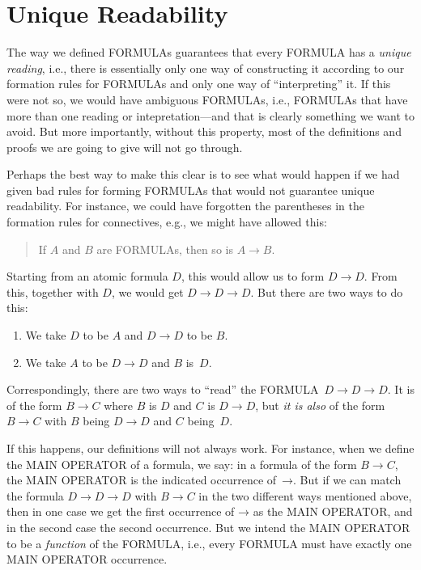 \documentclass[10pt,a4paper]{article}
\newcommand*{\olup}[1]{\MakeUppercase{#1}}
\theoremstyle{plain}
\theoremstyle{definition}
\theoremstyle{remark}
\newenvironment{explain}{}{}
\newcommand*{\olfileid}[3]{}
\newcommand*{\olsection}[1]{\section*{#1}}
\providecommand{\lif}{\mathbin{\rightarrow}}
\begin{document}



\olfileid{fol}{syn}{unq}

\olsection{Unique Readability}

\begin{explain}
The way we defined \olup{formula}s guarantees that every \olup{formula} has
a \emph{unique reading}, i.e., there is essentially only one way of
constructing it according to our formation rules for \olup{formula}s and
only one way of ``interpreting'' it.  If this were not so, we would
have ambiguous \olup{formula}s, i.e., \olup{formula}s that have more than
one reading or intepretation---and that is clearly something we want
to avoid.  But more importantly, without this property, most of the
definitions and proofs we are going to give will not go through.

Perhaps the best way to make this clear is to see what would happen if
we had given bad rules for forming \olup{formula}s that would not
guarantee unique readability.  For instance, we could have forgotten
the parentheses in the formation rules for connectives, e.g., we might
have allowed this:
\begin{quote}
If $A$ and $B$ are \olup{formula}s, then so is $A \lif B$.
\end{quote}
Starting from an atomic formula $D$, this would allow us to form $D
\lif D$. From this, together with $D$, we would get $D \lif D
\lif D$.  But there are two ways to do this:
\begin{enumerate}
\item We take $D$ to be $A$ and $D \lif D$ to be $B$.
\item We take $A$ to be $D \lif D$ and $B$ is~$D$.  
\end{enumerate}
Correspondingly, there are two ways to
``read'' the \olup{formula}~$D \lif D \lif D$. It is of the form $B
\lif C$ where $B$ is $D$ and $C$ is $D \lif D$, but \emph{it is
  also} of the form $B \lif C$ with $B$ being $D \lif D$ and $C$
being~$D$.

If this happens, our definitions will not always work. For instance,
when we define the \olup{main operator} of a formula, we say: in a
formula of the form $B \lif C$, the \olup{main operator} is the
indicated occurrence of~$\lif$. But if we can match the formula $D
\lif D \lif D$ with $B \lif C$ in the two different ways mentioned
above, then in one case we get the first occurrence of $\lif$ as the
\olup{main operator}, and in the second case the second occurrence.  But
we intend the \olup{main operator} to be a \emph{function} of the
\olup{formula}, i.e., every \olup{formula} must have exactly one \olup{main
  operator} occurrence.
\end{explain}
\end{document}
